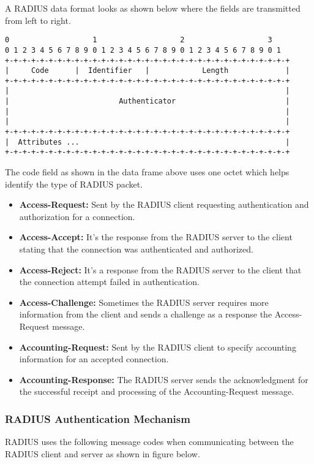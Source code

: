 A RADIUS data format looks as shown below where the fields are transmitted from left to right.

\begin{lstlisting}
0                   1                   2                   3
0 1 2 3 4 5 6 7 8 9 0 1 2 3 4 5 6 7 8 9 0 1 2 3 4 5 6 7 8 9 0 1
+-+-+-+-+-+-+-+-+-+-+-+-+-+-+-+-+-+-+-+-+-+-+-+-+-+-+-+-+-+-+-+-+
|     Code      |  Identifier   |            Length             |
+-+-+-+-+-+-+-+-+-+-+-+-+-+-+-+-+-+-+-+-+-+-+-+-+-+-+-+-+-+-+-+-+
|                                                               |
|                         Authenticator                         |
|                                                               |
|                                                               |
+-+-+-+-+-+-+-+-+-+-+-+-+-+-+-+-+-+-+-+-+-+-+-+-+-+-+-+-+-+-+-+-+
|  Attributes ...												|
+-+-+-+-+-+-+-+-+-+-+-+-+-+-+-+-+-+-+-+-+-+-+-+-+-+-+-+-+-+-+-+-+

\end{lstlisting}

The code field as shown in the data frame above uses one octet which helps identify the type of RADIUS packet.
\begin{itemize}
	\item \textbf{Access-Request:} Sent by the RADIUS client requesting authentication and authorization for a connection.
	\item \textbf{Access-Accept:} It’s the response from the RADIUS server to the client stating that the connection was authenticated and authorized.
	\item \textbf{Access-Reject:} It’s a response from the RADIUS server to the client that the connection attempt failed in authentication.
	\item \textbf{Access-Challenge:} Sometimes the RADIUS server requires more information from the client and sends a challenge as a response the Access-Request message.
	\item \textbf{Accounting-Request:} Sent by the RADIUS client to specify accounting information for an accepted connection.
	\item \textbf{Accounting-Response:} The RADIUS server sends the acknowledgment for the successful receipt and processing of the Accounting-Request message.
	
\end{itemize}

\subsubsection{RADIUS Authentication Mechanism} \label{RADIUS_auth_mechanism}
RADIUS uses the following message codes when communicating between the RADIUS client and server as shown in figure below.

